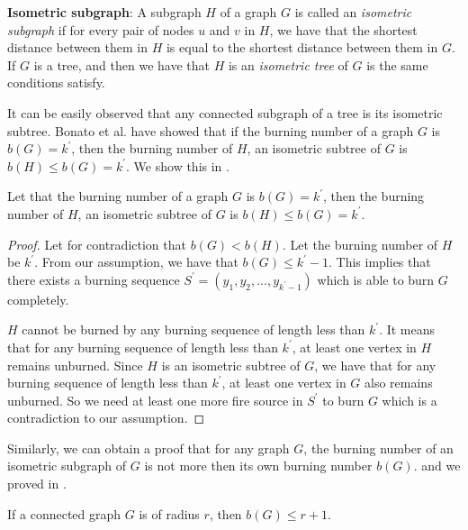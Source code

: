 \textbf{Isometric subgraph}: A subgraph $H$ of a graph $G$ is called an \textit{isometric subgraph} if for every pair of nodes $u$ and $v$ in $H$, we have that the shortest distance between them in $H$ is equal to the shortest distance between them in $G$. If $G$ is a tree, and then we have that $H$ is an \textit{isometric tree} of $G$ is the same conditions satisfy.

It can be easily observed that any connected subgraph of a tree is its isometric subtree. Bonato et al. \cite{Bonato2016} have showed that if the burning number of a graph $G$ is $b(G)=k^\prime$, then the burning number of $H$, an isometric subtree of $G$ is $b(H)\leq b(G)=k^\prime$. We show this in .

\begin{theorem}\label{theorem:burn-isomorphic-subtree}
    Let that the burning number of a graph $G$ is $b(G)=k^\prime$, then the burning number of $H$, an isometric subtree of $G$ is $b(H)\leq b(G)=k^\prime$.
\end{theorem}

\begin{proof}
    Let for contradiction that $b(G)<b(H)$. Let the burning number of $H$ be $k^\prime$. From our assumption, we have that $b(G)\leq k^\prime-1$. This implies that there exists a burning sequence $S^\prime=(y_1,y_2,...,y_{k^\prime-1})$ which is able to burn $G$ completely.
    
    $H$ cannot be burned by any burning sequence of length less than $k^\prime$. It means that for any burning sequence of length less than $k^\prime$, at least one vertex in $H$ remains unburned. Since $H$ is an isometric subtree of $G$, we have that for any burning sequence of length less than $k^\prime$, at least one vertex in $G$ also remains unburned. So we need at least one more fire source in $S^\prime$ to burn $G$ which is a contradiction to our assumption.
\end{proof}

Similarly, we can obtain a proof that for any graph $G$, the burning number of an isometric subgraph of $G$ is not more then its own burning number $b(G)$.  and  we proved in \cite{Bonato2016}.

\begin{theorem}\label{theorem:burn-connected-graph-radius-r}
    If a connected graph $G$ is of radius $r$, then $b(G)\leq r+1$.
\end{theorem}

